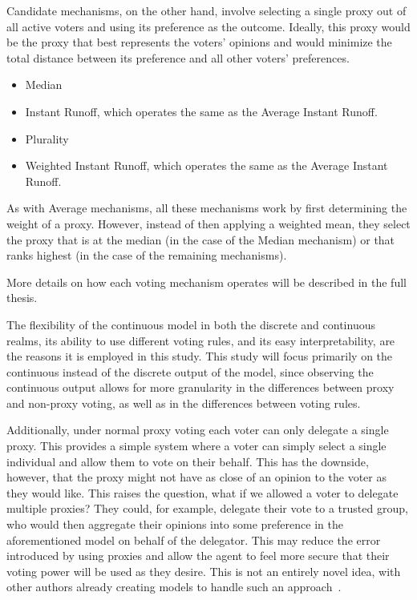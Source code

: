 Candidate mechanisms, on the other hand, involve selecting a single proxy out of all
active voters and using its preference as the outcome.
Ideally, this proxy would be the proxy that best represents the voters' opinions and
would minimize the total distance between its preference and all other voters'
preferences.
\begin{itemize}
    \item Median
    \item Instant Runoff, which operates the same as the Average Instant Runoff.
    \item Plurality
    \item Weighted Instant Runoff, which operates the same as the Average Instant
    Runoff.
\end{itemize}
As with Average mechanisms, all these mechanisms work by first determining the weight
of a proxy.
However, instead of then applying a weighted mean, they select the proxy that is
at the median (in the case of the Median mechanism) or that ranks highest (in the case
of the remaining mechanisms).

More details on how each voting mechanism operates will be described in the full thesis.

The flexibility of the continuous model in both the discrete and continuous realms, its
ability to use different voting rules, and its easy interpretability, are the reasons
it is employed in this study.
This study will focus primarily on the continuous instead of the discrete output of
the model, since observing the continuous output allows for more granularity in the
differences between proxy and non-proxy voting, as well as in the differences between
voting rules.

Additionally, under normal proxy voting each voter can only delegate a single proxy.
This provides a simple system where a voter can simply select a single individual and
allow them to vote on their behalf.
This has the downside, however, that the proxy might not have as close of an opinion
to the voter as they would like.
This raises the question, what if we allowed a voter to delegate multiple proxies?
They could, for example, delegate their vote to a trusted group, who would then
aggregate their opinions into some preference in the aforementioned model on behalf of
the delegator.
This may reduce the error introduced by using proxies and allow the agent to feel
more secure that their voting power will be used as they desire.
This is not an entirely novel idea, with other authors already creating models to
handle such an approach~\cite{Degrave2014,Colley2021,Golz2021}.

